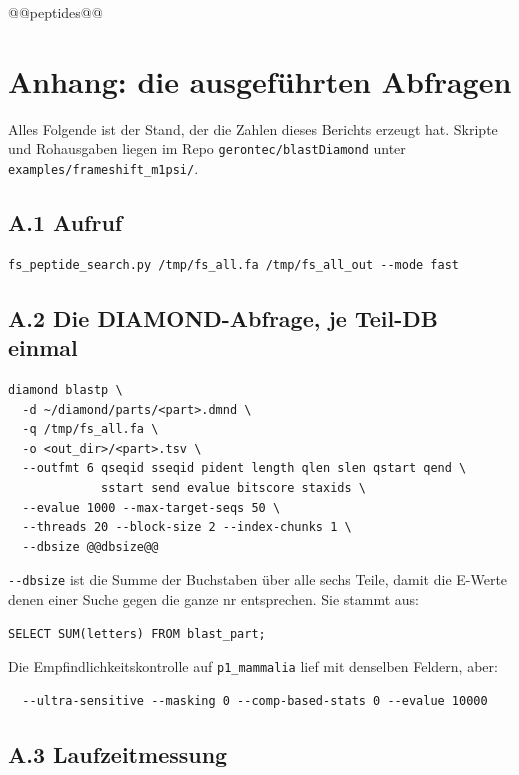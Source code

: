\documentclass[11pt,a4paper]{article}
\begin{document}
\footnotesize
@@peptides@@
\normalsize

\section{Anhang: die ausgeführten Abfragen}

Alles Folgende ist der Stand, der die Zahlen dieses Berichts erzeugt hat.
Skripte und Rohausgaben liegen im Repo \texttt{gerontec/blastDiamond} unter
\texttt{examples/frameshift\_m1psi/}.

\subsection*{A.1 Aufruf}

\begin{lstlisting}
fs_peptide_search.py /tmp/fs_all.fa /tmp/fs_all_out --mode fast
\end{lstlisting}

\subsection*{A.2 Die DIAMOND-Abfrage, je Teil-DB einmal}

\begin{lstlisting}
diamond blastp \
  -d ~/diamond/parts/<part>.dmnd \
  -q /tmp/fs_all.fa \
  -o <out_dir>/<part>.tsv \
  --outfmt 6 qseqid sseqid pident length qlen slen qstart qend \
             sstart send evalue bitscore staxids \
  --evalue 1000 --max-target-seqs 50 \
  --threads 20 --block-size 2 --index-chunks 1 \
  --dbsize @@dbsize@@
\end{lstlisting}

\texttt{-{}-dbsize} ist die Summe der Buchstaben über alle sechs Teile, damit
die E-Werte denen einer Suche gegen die ganze nr entsprechen. Sie stammt aus:

\begin{lstlisting}
SELECT SUM(letters) FROM blast_part;
\end{lstlisting}

Die Empfindlichkeitskontrolle auf \texttt{p1\_mammalia} lief mit denselben
Feldern, aber:

\begin{lstlisting}
  --ultra-sensitive --masking 0 --comp-based-stats 0 --evalue 10000
\end{lstlisting}

\subsection*{A.3 Laufzeitmessung}
\end{document}
